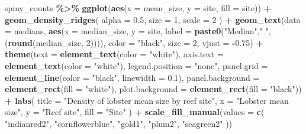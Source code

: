 \documentclass[
]{article}
\newenvironment{Shaded}{\begin{snugshade}}{\end{snugshade}}
\newcommand{\AttributeTok}[1]{\textcolor[rgb]{0.13,0.29,0.53}{#1}}
\newcommand{\DecValTok}[1]{\textcolor[rgb]{0.00,0.00,0.81}{#1}}
\newcommand{\FloatTok}[1]{\textcolor[rgb]{0.00,0.00,0.81}{#1}}
\newcommand{\FunctionTok}[1]{\textcolor[rgb]{0.13,0.29,0.53}{\textbf{#1}}}
\newcommand{\NormalTok}[1]{#1}
\newcommand{\SpecialCharTok}[1]{\textcolor[rgb]{0.81,0.36,0.00}{\textbf{#1}}}
\newcommand{\StringTok}[1]{\textcolor[rgb]{0.31,0.60,0.02}{#1}}
\begin{document}
\begin{Shaded}
\begin{Highlighting}[]
\NormalTok{spiny\_counts }\SpecialCharTok{\%\textgreater{}\%} 
  \FunctionTok{ggplot}\NormalTok{(}\FunctionTok{aes}\NormalTok{(}\AttributeTok{x =}\NormalTok{ mean\_size, }\AttributeTok{y =}\NormalTok{ site, }\AttributeTok{fill =}\NormalTok{ site)) }\SpecialCharTok{+}
  \FunctionTok{geom\_density\_ridges}\NormalTok{(}
    \AttributeTok{alpha =} \FloatTok{0.5}\NormalTok{,}
    \AttributeTok{size =} \DecValTok{1}\NormalTok{,}
    \AttributeTok{scale =} \DecValTok{2}
\NormalTok{  ) }\SpecialCharTok{+}
  \FunctionTok{geom\_text}\NormalTok{(}\AttributeTok{data =}\NormalTok{ medians, }
            \FunctionTok{aes}\NormalTok{(}\AttributeTok{x =}\NormalTok{ median\_size, }
                \AttributeTok{y =}\NormalTok{ site, }
                \AttributeTok{label =} \FunctionTok{paste0}\NormalTok{(}\StringTok{"Median"}\NormalTok{,}\StringTok{" "}\NormalTok{,(}\FunctionTok{round}\NormalTok{(median\_size, }\DecValTok{2}\NormalTok{)))),}
            \AttributeTok{color =} \StringTok{"black"}\NormalTok{, }
            \AttributeTok{size =} \DecValTok{2}\NormalTok{, }
            \AttributeTok{vjust =} \SpecialCharTok{{-}}\FloatTok{0.75}\NormalTok{) }\SpecialCharTok{+}
  \FunctionTok{theme}\NormalTok{(}\AttributeTok{text =} \FunctionTok{element\_text}\NormalTok{(}\AttributeTok{color =} \StringTok{"white"}\NormalTok{),}
        \AttributeTok{axis.text =} \FunctionTok{element\_text}\NormalTok{(}\AttributeTok{color =} \StringTok{"white"}\NormalTok{),}
        \AttributeTok{legend.position =} \StringTok{"none"}\NormalTok{,}
        \AttributeTok{panel.grid =} \FunctionTok{element\_line}\NormalTok{(}\AttributeTok{color =} \StringTok{"black"}\NormalTok{,}
                                  \AttributeTok{linewidth =} \FloatTok{0.1}\NormalTok{),}
        \AttributeTok{panel.background =} \FunctionTok{element\_rect}\NormalTok{(}\AttributeTok{fill =} \StringTok{"white"}\NormalTok{),}
        \AttributeTok{plot.background =} \FunctionTok{element\_rect}\NormalTok{(}\AttributeTok{fill =} \StringTok{"black"}\NormalTok{)) }\SpecialCharTok{+}
  \FunctionTok{labs}\NormalTok{(}
    \AttributeTok{title =} \StringTok{"Density of lobster mean size by reef site"}\NormalTok{,}
    \AttributeTok{x =} \StringTok{"Lobster mean size"}\NormalTok{, }
    \AttributeTok{y =} \StringTok{"Reef site"}\NormalTok{,}
    \AttributeTok{fill =} \StringTok{"Site"}
\NormalTok{  ) }\SpecialCharTok{+} 
  \FunctionTok{scale\_fill\_manual}\NormalTok{(}\AttributeTok{values =} \FunctionTok{c}\NormalTok{(}
    \StringTok{"indianred2"}\NormalTok{, }\StringTok{"cornflowerblue"}\NormalTok{, }\StringTok{"gold1"}\NormalTok{, }\StringTok{"plum2"}\NormalTok{, }\StringTok{"seagreen2"}
\NormalTok{  )) }
\end{Highlighting}
\end{Shaded}
\end{document}
